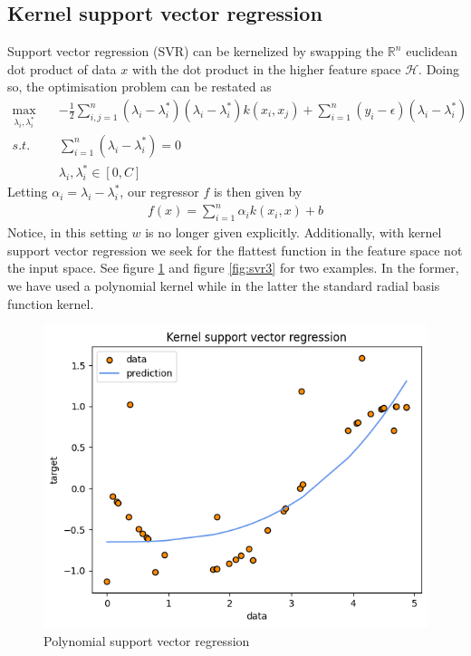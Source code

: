 \subsection{Kernel support vector regression}
Support vector regression (SVR) can be kernelized by swapping the $\mathbb{R}^n$ euclidean dot product of data $x$ with the dot product in the higher feature space $\mathcal{H}$. Doing so, the optimisation problem can be restated as
\begin{equation}
    \begin{aligned}
        \max_{\lambda_i, \lambda_i^*} \quad& -\frac{1}{2}\sum\limits_{i,j=1}^n(\lambda_i-\lambda_i^*)(\lambda_i-\lambda_i^*)k(x_i, x_j)+\sum\limits_{i=1}^n(y_i-\epsilon)(\lambda_i-\lambda_i^*)
        \\
        s.t. \quad& \sum\limits_{i=1}^n(\lambda_i-\lambda_i^*)=0
        \\
        \quad& \lambda_i, \lambda_i^* \in [0,C]
    \end{aligned}
\end{equation}
Letting $\alpha_i=\lambda_i - \lambda_i^*$, our regressor $f$ is then given by
\begin{equation}
    \begin{aligned}
        f(x)=\sum\limits_{i=1}^n \alpha_i k(x_i, x)+b
    \end{aligned}
\end{equation}
Notice, in this setting $w$ is no longer given explicitly. Additionally, with kernel support vector regression we seek for the flattest function in the feature space not the input space.
See figure \ref{fig:svr2} and figure \ref{fig:svr3} for two examples. In the former, we have used a polynomial kernel while in the latter the standard radial basis function kernel.
\begin{figure}
    \includegraphics[width=\textwidth]{images/svr2.png}
    \caption{Polynomial support vector regression}
    \label{fig:svr2}
\end{figure}

